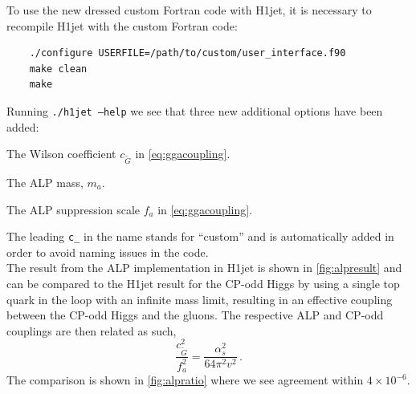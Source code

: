 \documentclass[12pt,a4wide]{article}
\begin{document}
To use the new dressed custom Fortran code with H1jet, it is necessary to recompile H1jet with the custom Fortran code: 
\begin{lstlisting}
	./configure USERFILE=/path/to/custom/user_interface.f90 
	make clean
	make 
\end{lstlisting}
Running \texttt{./h1jet --help} we see that three new additional options have been added: 
\begin{description}[labelindent=\parindent, labelwidth =\widthof{\bfseries9999999999999999999999}, leftmargin = !] 
	\item[\texttt{--c\_CGtil <value>}] The Wilson coefficient $c_{\tilde{G}}$ in \autoref{eq:ggacoupling}. 
	\item[\texttt{--c\_mA <value>}] The ALP mass, $m_a$. 
	\item[\texttt{--c\_fa <value>}] The ALP suppression scale $f_a$ in \autoref{eq:ggacoupling}. 
\end{description}
The leading \texttt{c\_} in the name stands for ``custom'' and is automatically added in order to avoid naming issues in the code. \\ 

The result from the ALP implementation in H1jet is shown in \autoref{fig:alpresult} and can be compared to the H1jet result for the CP-odd Higgs by using a single top quark in the loop with an infinite mass limit, resulting in an effective coupling between the CP-odd Higgs and the gluons. The respective ALP and CP-odd couplings are then related as such, 
\begin{equation}
	\frac{c_{\tilde{G}}^2}{f_a^2} = \frac{\alpha_s^2}{64 \pi^2 v^2} \,. 
\end{equation}
The comparison is shown in \ref{fig:alpratio} where we see agreement within $4\times 10^{-6}$. 
\end{document}
